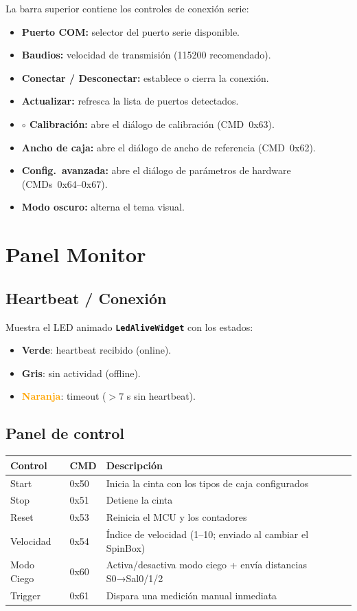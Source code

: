\documentclass[12pt,a4paper]{report}
\newcommand{\class}[1]{\texttt{\textbf{#1}}}
\begin{document}
La barra superior contiene los controles de conexión serie:

\begin{itemize}
  \item \textbf{Puerto COM:} selector del puerto serie disponible.
  \item \textbf{Baudios:} velocidad de transmisión (115200 recomendado).
  \item \textbf{Conectar / Desconectar:} establece o cierra la conexión.
  \item \textbf{Actualizar:} refresca la lista de puertos detectados.
  \item \textbf{$\circ$ Calibración:} abre el diálogo de calibración (CMD~0x63).
  \item \textbf{Ancho de caja:} abre el diálogo de ancho de referencia (CMD~0x62).
  \item \textbf{Config.\ avanzada:} abre el diálogo de parámetros de hardware (CMDs~0x64–0x67).
  \item \textbf{Modo oscuro:} alterna el tema visual.
\end{itemize}

\section{Panel Monitor}

\subsection{Heartbeat / Conexión}

Muestra el LED animado \class{LedAliveWidget} con los estados:
\begin{itemize}
  \item \textcolor{green!60!black}{\textbf{Verde}}: heartbeat recibido (online).
  \item \textbf{Gris}: sin actividad (offline).
  \item \textcolor{orange}{\textbf{Naranja}}: timeout ($> 7$ s sin heartbeat).
\end{itemize}

\subsection{Panel de control}

\begin{tabular}{lll}
  \toprule
  \textbf{Control} & \textbf{CMD} & \textbf{Descripción} \\
  \midrule
  Start & 0x50 & Inicia la cinta con los tipos de caja configurados \\
  Stop  & 0x51 & Detiene la cinta \\
  Reset & 0x53 & Reinicia el MCU y los contadores \\
  Velocidad & 0x54 & Índice de velocidad (1–10; enviado al cambiar el SpinBox) \\
  Modo Ciego & 0x60 & Activa/desactiva modo ciego + envía distancias S0→Sal0/1/2 \\
  Trigger & 0x61 & Dispara una medición manual inmediata \\
  \bottomrule
\end{tabular}
\end{document}
